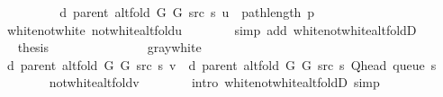 \begin{isabellebody}
\ \ \ \ \isamarkupfalse%
\ \isamarkupfalse%
\ {\isachardoublequoteopen}{\isachardot}{\kern0pt}{\isachardot}{\kern0pt}{\isachardot}{\kern0pt}\ {\isacharequal}{\kern0pt}\ d\ {\isacharparenleft}{\kern0pt}parent\ {\isacharparenleft}{\kern0pt}alt{\isacharunderscore}{\kern0pt}fold\ G{}\ G{}\ src\ s{\isacharparenright}{\kern0pt}{\isacharparenright}{\kern0pt}\ u\ {\isacharplus}{\kern0pt}\ path{\isacharunderscore}{\kern0pt}length\ p{\isachardoublequoteclose}\isanewline
\ \ \ \ \ \ \isamarkupfalse%
\ white{\isacharunderscore}{\kern0pt}not{\isacharunderscore}{\kern0pt}white\ not{\isacharunderscore}{\kern0pt}white{\isacharunderscore}{\kern0pt}alt{\isacharunderscore}{\kern0pt}fold{\isacharunderscore}{\kern0pt}u\isanewline
\ \ \ \ \ \ \isamarkupfalse%
\ {\isacharparenleft}{\kern0pt}simp\ add{\isacharcolon}{\kern0pt}\ white{\isacharunderscore}{\kern0pt}not{\isacharunderscore}{\kern0pt}white{\isacharunderscore}{\kern0pt}alt{\isacharunderscore}{\kern0pt}foldD{\isacharunderscore}{\kern0pt}{}{\isacharparenright}{\kern0pt}\isanewline
\ \ \ \ \isamarkupfalse%
\ \isamarkupfalse%
\ {\isacharquery}{\kern0pt}thesis\isanewline
\ \ \ \ \ \ \isacommand{{\isachardot}{\kern0pt}}\isamarkupfalse%
\isanewline
\ \ \isamarkupfalse%
\isanewline
\ \ \ \ \isamarkupfalse%
\ gray{\isacharunderscore}{\kern0pt}white\isanewline
\ \ \ \ \isamarkupfalse%
\ {\isachardoublequoteopen}d\ {\isacharparenleft}{\kern0pt}parent\ {\isacharparenleft}{\kern0pt}alt{\isacharunderscore}{\kern0pt}fold\ G{}\ G{}\ src\ s{\isacharparenright}{\kern0pt}{\isacharparenright}{\kern0pt}\ v\ {\isacharequal}{\kern0pt}\ d\ {\isacharparenleft}{\kern0pt}parent\ {\isacharparenleft}{\kern0pt}alt{\isacharunderscore}{\kern0pt}fold\ G{}\ G{}\ src\ s{\isacharparenright}{\kern0pt}{\isacharparenright}{\kern0pt}\ {\isacharparenleft}{\kern0pt}Q{\isacharunderscore}{\kern0pt}head\ {\isacharparenleft}{\kern0pt}queue\ s{\isacharparenright}{\kern0pt}{\isacharparenright}{\kern0pt}\ {\isacharplus}{\kern0pt}\ {}{\isachardoublequoteclose}\isanewline
\ \ \ \ \ \ \isamarkupfalse%
\ not{\isacharunderscore}{\kern0pt}white{\isacharunderscore}{\kern0pt}alt{\isacharunderscore}{\kern0pt}fold{\isacharunderscore}{\kern0pt}v\isanewline
\ \ \ \ \ \ \isamarkupfalse%
\ {\isacharparenleft}{\kern0pt}intro\ white{\isacharunderscore}{\kern0pt}not{\isacharunderscore}{\kern0pt}white{\isacharunderscore}{\kern0pt}alt{\isacharunderscore}{\kern0pt}foldD{\isacharunderscore}{\kern0pt}{}{\isacharparenright}{\kern0pt}\ simp\isanewline

\end{isabellebody}
